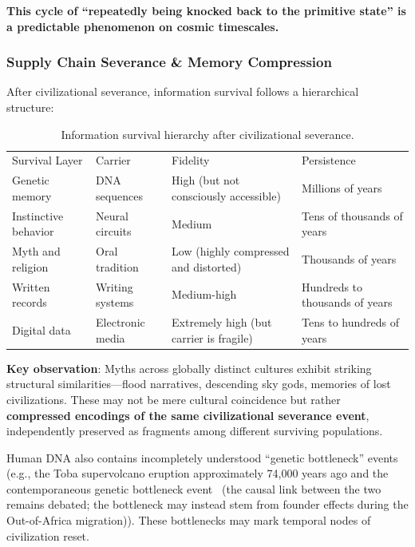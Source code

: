 \documentclass[aps,prd,twocolumn,superscriptaddress,nofootinbib]{revtex4-2}
\begin{document}
\textbf{This cycle of ``repeatedly being knocked back to the primitive state'' is a predictable phenomenon on cosmic timescales.}

\subsubsection{Supply Chain Severance \& Memory Compression}\label{sec:memory-compression}

After civilizational severance, information survival follows a hierarchical structure:

\begin{table}[htbp]
\caption{Information survival hierarchy after civilizational severance.}
\label{tab:memory}
\begin{ruledtabular}
\begin{tabular}{llll}
Survival Layer & Carrier & Fidelity & Persistence \\
\colrule
Genetic memory & DNA sequences & High (but not consciously accessible) & Millions of years \\
Instinctive behavior & Neural circuits & Medium & Tens of thousands of years \\
Myth and religion & Oral tradition & Low (highly compressed and distorted) & Thousands of years \\
Written records & Writing systems & Medium-high & Hundreds to thousands of years \\
Digital data & Electronic media & Extremely high (but carrier is fragile) & Tens to hundreds of years \\
\end{tabular}
\end{ruledtabular}
\end{table}

\textbf{Key observation}: Myths across globally distinct cultures exhibit striking structural similarities---flood narratives, descending sky gods, memories of lost civilizations. These may not be mere cultural coincidence but rather \textbf{compressed encodings of the same civilizational severance event}, independently preserved as fragments among different surviving populations.

Human DNA also contains incompletely understood ``genetic bottleneck'' events (e.g., the Toba supervolcano eruption approximately 74,000 years ago and the contemporaneous genetic bottleneck event~\cite{Ambrose1998} (the causal link between the two remains debated; the bottleneck may instead stem from founder effects during the Out-of-Africa migration)). These bottlenecks may mark temporal nodes of civilization reset.
\end{document}
